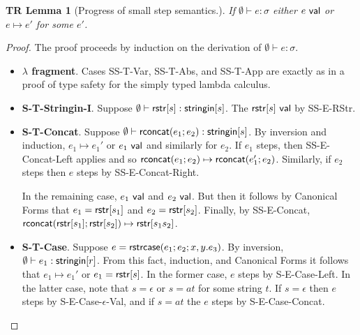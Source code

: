 \documentclass[12pt]{article}
\newtheorem{trlem}[tr]{TR Lemma}
\theoremstyle{definition}
\newcommand{\val}{{\sf val}}
\newcommand{\stringin}[1]{{\sf stringin}[#1]}
\newcommand{\strcase}[3]{ {\sf rstrcase}(#1; #2; #3)}
\newcommand{\lhead}[1]{ {\sf lhead}(#1) }
\newcommand{\ltail}[1]{ {\sf ltail}(#1) }
\begin{document}
\begin{trlem}[Progress of small step semantics.]
If $\emptyset\vdash e : \sigma$ either $e \ \val$ or $e \mapsto e'$ for some $e'$.
\end{trlem}
\begin{proof}
The proof proceeds by induction on the derivation of $\emptyset\vdash e : \sigma$.
\begin{itemize}[label=$ $,itemsep=1ex]
\item \textbf{$\lambda$ fragment}. Cases SS-T-Var, SS-T-Abs, and SS-T-App are exactly as in a proof of type safety for
the simply typed lambda calculus.

\item \textbf{S-T-Stringin-I}. Suppose $\emptyset\vdash \rstr{s} : \stringin{s}$.
The $\rstr{s} \ \val$ by SS-E-RStr.

\item \textbf{S-T-Concat}. Suppose $\emptyset\vdash \rconcat{e_1}{e_2} : \stringin{s}$.
By inversion and induction, $e_1 \mapsto e_1'$ or $e_1 \ \val$ and similarly
for $e_2$. 
If $e_1$ steps, then SS-E-Concat-Left applies and so
${\sf rconcat}(e_1;e_2) \mapsto {\sf rconcat}(e_1';e_2)$. Similarly, if $e_2$ steps
then $e$ steps by SS-E-Concat-Right.

In the remaining case, $e_1 \ \val$ and $e_2 \ \val$.
But then it follows by Canonical Forms that $e_1 = {\sf rstr}[s_1]$
and $e_2 = {\sf rstr}[s_2]$.
Finally, by SS-E-Concat, \\ ${\sf rconcat}({\sf rstr}[s_1];{\sf rstr}[s_2]) \mapsto {\sf rstr}[s_1s_2]$.

\def\mline#1{\par\hspace*{-\leftmargin}\parbox{\textwidth}{\[#1\]}}
\item \textbf{S-T-Case}.
Suppose $e = \strcase{e_1}{e_2}{x,y.e_3}$. 
By inversion,\\ $\emptyset\vdash e_1 : \stringin{r}$.
From this fact, induction, and Canonical Forms it follows that $e_1 \mapsto e_1'$ or $e_1 = {\sf rstr}[s]$.
In the former case, $e$ steps by S-E-Case-Left.
In the latter case, note that $s = \epsilon$ or $s = at$ for some string $t$.
If $s = \epsilon$ then $e$ steps by S-E-Case-$\epsilon$-Val,
and if $s = at$ the $e$ steps by S-E-Case-Concat.


\end{itemize}
\end{proof}
\end{document}
